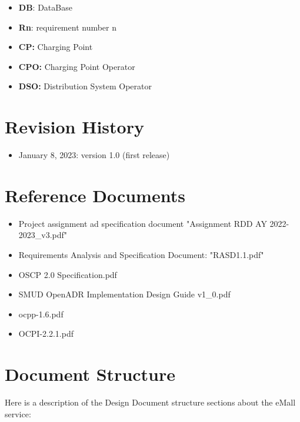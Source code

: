\documentclass{Configuration_Files/PoliMi3i_thesis}
\begin{document}
\begin{itemize}
    \item \textbf{DB}: DataBase
    \item \textbf{Rn}: requirement number n
    \item \textbf{CP:} Charging Point
    \item \textbf{CPO:} Charging Point Operator
    \item \textbf{DSO:} Distribution System Operator
\end{itemize}

\section{Revision History}

\begin{itemize}
    \item January 8, 2023: version 1.0 (first release)
\end{itemize}

\section{Reference Documents}
\begin{itemize}
    \item Project assignment ad specification document "Assignment RDD AY 2022-2023\_v3.pdf"
    \item Requirements Analysis and Specification Document: "RASD1.1.pdf"
    \item OSCP 2.0 Specification.pdf
    \item SMUD OpenADR Implementation Design Guide v1\_0.pdf
    \item ocpp-1.6.pdf
    \item OCPI-2.2.1.pdf
\end{itemize}

\section{Document Structure}

Here is a description of the Design Document structure sections about the eMall service:
\end{document}
